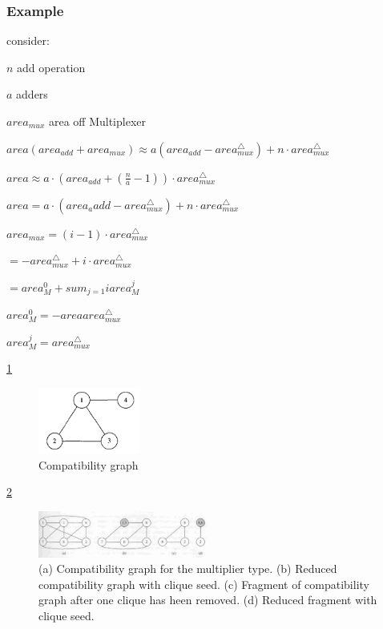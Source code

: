 \subsubsection{Example}
consider:

$ n $ add operation

$ a $ adders

$ area_{mux} $ area off Multiplexer


$ area(area_{add}+area_{mux})\approx a(area_{add}- area_{mux}^{\bigtriangleup})+n \cdot area_{mux}^{\bigtriangleup}  $

$ area\approx a\cdot (area_{add}+(\frac{n}{a}-1)) \cdot area_{mux}^{\bigtriangleup} $

$  area=a\cdot (area_a{add}-area_{mux}^{\bigtriangleup})+n\cdot area_{mux}^{\bigtriangleup}$


$area_{mux} = (i-1)\cdot area_{mux}^{\bigtriangleup} $

$=-area_{mux}^{\bigtriangleup} + i \cdot area_{mux}^{\bigtriangleup}  $

$=area_{M}^{0} + sum_{j=1}{i} area_{M}^{j}$

$ area_{M}^{0} = -areaarea_{mux}^{\bigtriangleup} $

$ area_{M}^{j}=area_{mux}^{\bigtriangleup} $






\ref{fig:Comparibility_graph_mux}
\begin{figure}[h]
    \centering
    \includegraphics[width=0.3\textwidth]{Comparibility_graph_mux}
    \caption{ Compatibility graph \cite{b1}}
    \label{fig:Comparibility_graph_mux}
\end{figure}

\ref{fig:Comparibility_graph_mux_2}
\begin{figure}[h]
    \centering
    \includegraphics[width=0.5\textwidth]{Comparibility_graph_mux_2}
    \caption{ (a) Compatibility graph for the multiplier type. (b) Reduced compatibility graph with clique seed. (c) Fragment of compatibility graph after one clique has heen removed. (d) Reduced fragment with clique seed. \cite{b1}}
    \label{fig:Comparibility_graph_mux_2}
\end{figure}
